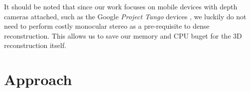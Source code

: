 \documentclass[conference,10pt]{IEEEtran}
\begin{document}
It should be noted that since our work focuses on mobile devices with depth
cameras attached, such as the Google \emph{Project Tango} devices \cite{Tango}, 
we luckily do not need to perform costly monocular stereo as a pre-requisite to
dense reconstruction. This allows us to save our memory and CPU buget for the
3D reconstruction itself.

\section{Approach} 
\end{document}
